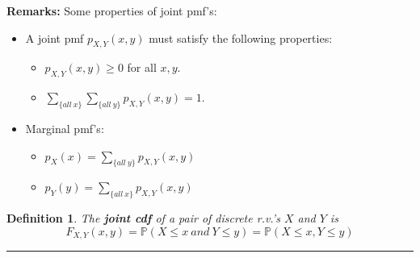 \documentclass[12pt]{amsart}
\newtheorem{definition}[theorem]{Definition}
\begin{document}
{%
\newpage

\textbf{Remarks:} Some properties of joint pmf's:%

\begin{itemize}
\item A joint pmf $p_{X,Y}(x,y)$ must satisfy the following properties:
	\begin{itemize}
	\item $p_{X,Y}(x,y)\geq 0$ for all $x, y$.
	\item $\sum \limits_{\{all\ x\}} \sum \limits_{\{all\ y\}} p_{X,Y}(x,y)=1$.
	\end{itemize}
\vspace{1cm}
\item Marginal pmf's:
	\begin{itemize}
	\item $p_X(x) = \sum \limits_{\{all\ y\}} p_{X,Y}(x,y)$
	\item $p_Y(y) = \sum \limits_{\{all\ x\}} p_{X,Y}(x,y)$	
	\end{itemize}
\end{itemize}




\newpage

\begin{definition}
The \textbf{joint cdf} of a pair of discrete r.v.'s $X$ and $Y$ is 
$$
F_{X,Y}(x,y) = \mathbb{P}(X \leq x\ and\ Y \leq y) = \mathbb{P}(X \leq x, Y \leq y)
$$ 
\end{definition}


\vspace{.5cm}
\hrule
\vspace{.5cm}



}
\end{document}
